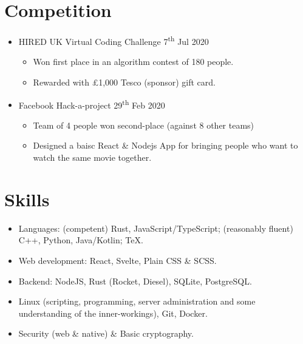   \section{Competition}

  \begin{itemize}
    \item HIRED \dashdiv{} UK Virtual Coding Challenge \dashdiv{} 7\textsuperscript{th} Jul 2020
    \begin{itemize}
      \item Won first place in an algorithm contest of 180 people.
      \item Rewarded with £1,000 Tesco (sponsor) gift card.
    \end{itemize}
    \item Facebook \dashdiv{} Hack-a-project \dashdiv{} 29\textsuperscript{th} Feb 2020
    \begin{itemize}
      \item Team of 4 people won second-place (against 8 other teams)
      \item Designed a baisc React \& Nodejs App  for bringing people who want to watch the same movie together.
    \end{itemize}
  \end{itemize}

  \section{Skills}

  \begin{itemize}[itemsep=0.1\parskip]
    \item Languages: (competent) Rust, JavaScript/TypeScript; (reasonably fluent) C++, Python, Java/Kotlin; \TeX.

    \item Web development: React, Svelte, Plain CSS \& SCSS.

    \item Backend: NodeJS, Rust (Rocket, Diesel), SQLite, PostgreSQL.

    \item Linux (scripting, programming, server administration and some understanding of the inner-workings), Git, Docker. %

    \item Security (web \& native) \& Basic cryptography.

  \end{itemize}

